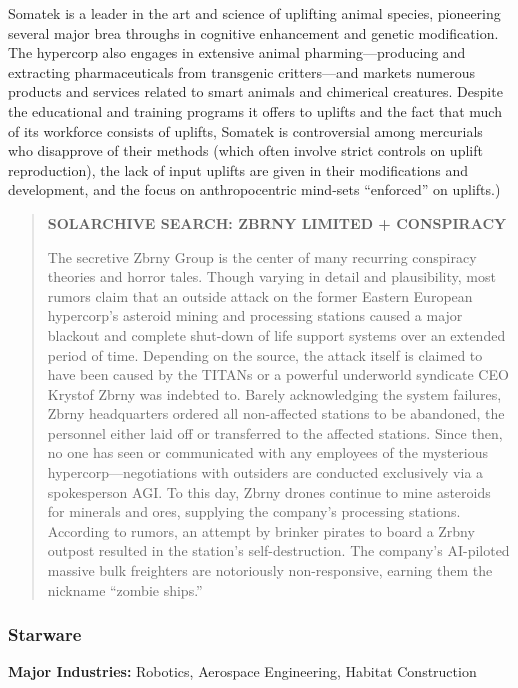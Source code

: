 Somatek is a leader in the art and science of uplifting animal species, pioneering several major brea throughs in cognitive enhancement and genetic modification. The hypercorp also engages in extensive animal pharming—producing and extracting pharmaceuticals from transgenic critters—and markets numerous products and services related to smart animals and chimerical creatures. Despite the educational and training programs it offers to uplifts and the fact that much of its workforce consists of uplifts, Somatek is controversial among mercurials who disapprove of their methods (which often involve strict controls on uplift reproduction), the lack of input uplifts are given in their modifications and development, and the focus on anthropocentric mind-sets “enforced” on uplifts.) 

\begin{quotation} \textbf{SOLARCHIVE SEARCH: ZBRNY LIMITED + CONSPIRACY} 

The secretive Zbrny Group is the center of many recurring conspiracy theories and horror tales. Though varying in detail and plausibility, most rumors claim that an outside attack on the former Eastern European hypercorp’s asteroid mining and processing stations caused a major blackout and complete shut-down of life support systems over an extended period of time. Depending on the source, the attack itself is claimed to have been caused by the TITANs or a powerful underworld syndicate CEO Krystof Zbrny was indebted to. Barely acknowledging the system failures, Zbrny headquarters ordered all non-affected stations to be abandoned, the personnel either laid off or transferred to the affected stations. Since then, no one has seen or communicated with any employees of the mysterious hypercorp—negotiations with outsiders are conducted exclusively via a spokesperson AGI. To this day, Zbrny drones continue to mine asteroids for minerals and ores, supplying the company’s processing stations. According to rumors, an attempt by brinker pirates to board a Zrbny outpost resulted in the station’s self-destruction. The company’s AI-piloted massive bulk freighters are notoriously non-responsive, earning them the nickname “zombie ships.” \end{quotation} 

\subsubsection{Starware} \label{sec:starware} 

\textbf{Major Industries:} Robotics, Aerospace Engineering, Habitat Construction 

